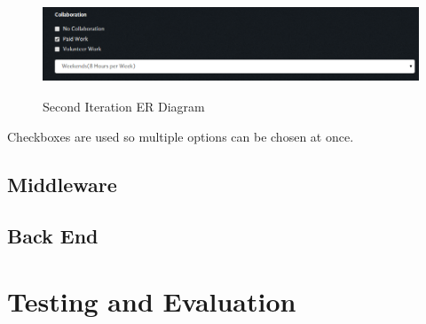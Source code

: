 \documentclass[a4paper,oneside,11pt]{report}
\begin{document}
\begin{figure}[!ht]
\centering
\includegraphics[width=\textwidth,height=3cm]{third-iteration-collaboration-availability.png}
\caption{Second Iteration ER Diagram}
\end{figure}

Checkboxes are used so multiple options can be chosen at once.
\subsection{Middleware}
\subsection{Back End}
\section{Testing and Evaluation}
\end{document}
